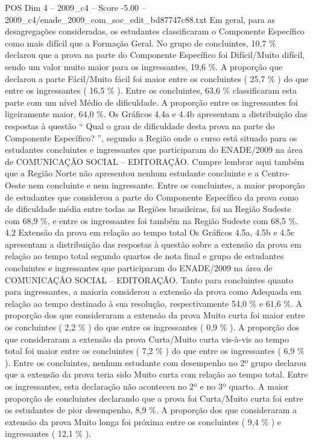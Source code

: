 \begin{textsample}{POS Dim 4 – 2009\_c4 – Score -5.00 – 2009\_c4/enade\_2009\_com\_soc\_edit\_bd87747c88.txt}
Em geral, para as desagregações consideradas, os estudantes classificaram o Componente Específico como mais difícil que a Formação Geral.
No grupo de concluintes, 10,7 \% declarou que a prova na parte do Componente Específico foi Difícil/Muito difícil, sendo um valor muito maior para os ingressantes, 19,6 \%.
A proporção que declarou a parte Fácil/Muito fácil foi maior entre os concluintes ( 25,7 \% ) do que entre os ingressantes ( 16,5 \% ).
Entre os concluintes, 63,6 \% classificaram esta parte com um nível Médio de dificuldade.
A proporção entre os ingressantes foi ligeiramente maior, 64,0 \%.
Os Gráficos 4.4a e 4.4b apresentam a distribuição das respostas à questão “ Qual o grau de dificuldade desta prova na parte do Componente Específico? ”, segundo a Região onde o curso está situado para os estudantes concluintes e ingressantes que participaram do ENADE/2009 na área de COMUNICAÇÃO SOCIAL – EDITORAÇÃO.
Cumpre lembrar aqui também que a Região Norte não apresentou nenhum estudante concluinte e a Centro-Oeste nem concluinte e nem ingressante.
Entre os concluintes, a maior proporção de estudantes que considerou a parte do Componente Específico da prova como de dificuldade média entre todas as Regiões brasileiras, foi na Região Sudeste com 68,9 \%, e entre os ingressantes foi também na Região Sudeste com 68,5 \%. 4.2 Extensão da prova em relação ao tempo total Os Gráficos 4.5a, 4.5b e 4.5c apresentam a distribuição das respostas à questão sobre a extensão da prova em relação ao tempo total segundo quartos de nota final e grupo de estudantes concluintes e ingressantes que participaram do ENADE/2009 na área de COMUNICAÇÃO SOCIAL – EDITORAÇÃO.
Tanto para concluintes quanto para ingressantes, a maioria considerou a extensão da prova como Adequada em relação ao tempo destinado à sua resolução, respectivamente 54,0 \% e 61,6 \%.
A proporção dos que consideraram a extensão da prova Muito curta foi maior entre os concluintes ( 2,2 \% ) do que entre os ingressantes ( 0,9 \% ).
A proporção dos que consideraram a extensão da prova Curta/Muito curta vis-à-vis ao tempo total foi maior entre os concluintes ( 7,2 \% ) do que entre os ingressantes ( 6,9 \% ).
Entre os concluintes, nenhum estudante com desempenho no 2º grupo declarou que a extensão da prova teria sido Muito curta com relação ao tempo total.
Entre os ingressantes, esta declaração não aconteceu no 2º e no 3º quarto.
A maior proporção de concluintes declarando que a prova foi Curta/Muito curta foi entre os estudantes de pior desempenho, 8,9 \%.
A proporção dos que consideraram a extensão da prova Muito longa foi próxima entre os concluintes ( 9,4 \% ) e ingressantes ( 12,1 \% ).

\end{textsample}
